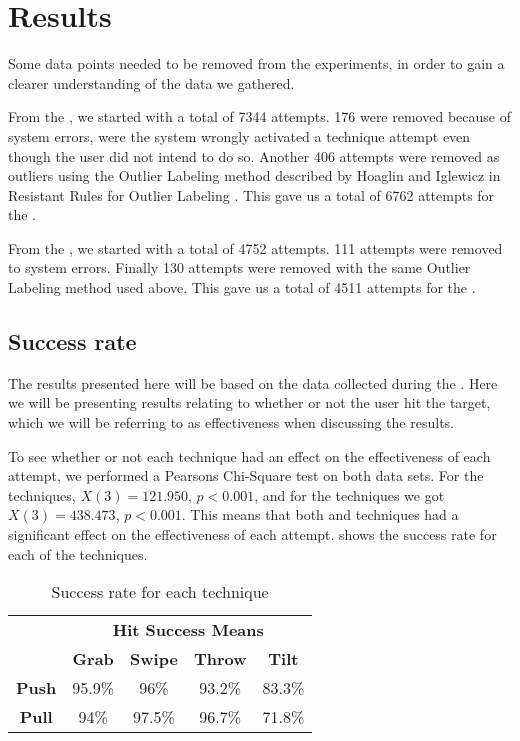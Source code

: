 \section{Results}\label{sec:results}
Some data points needed to be removed from the experiments, in order to gain a clearer understanding of the data we gathered. 

From the \target, we started with a total of 7344 attempts.
176 were removed because of system errors, were the system wrongly activated a technique attempt even though the user did not intend to do so.
Another 406 attempts were removed as outliers using the Outlier Labeling method described by Hoaglin and Iglewicz in Resistant Rules for Outlier Labeling \cite{Hoaglin:1987}.
This gave us a total of 6762 attempts for the \target.

From the \accuracy, we started with a total of 4752 attempts.
111 attempts were removed to system errors. 
Finally 130 attempts were removed with the same Outlier Labeling method used above.
This gave us a total of 4511 attempts for the \accuracy.

\subsection{Success rate}
The results presented here will be based on the data collected during the \target. 
Here we will be presenting results relating to whether or not the user hit the target, which we will be referring to as effectiveness when discussing the results. 

To see whether or not each technique had an effect on the effectiveness of each attempt, we performed a Pearsons Chi-Square test on both data sets. 
For the \push techniques, $X(3)=121.950$, $p<0.001$, and for the \pull techniques we got $X(3)=438.473$, $p<0.001$. 
This means that both \push and \pull techniques had a significant effect on the effectiveness of each attempt. 
 shows the success rate for each of the techniques. 

\begin{table}[H]
	\centering
	\def\arraystretch{1.5}
		\begin{tabular}{c c c c c}
			\cline{2-5}
			& \multicolumn{4}{c}{\textbf{Hit Success Means}} \\
			\cline{2-5}
			& \textbf{Grab} & \textbf{Swipe} & \textbf{Throw} & \textbf{Tilt} \\ \hline
			\textbf{Push} & 95.9\% & 96\% & 93.2\% & 83.3\% \\ \hline
			\textbf{Pull} & 94\% & 97.5\% & 96.7\% & 71.8\% \\ \hline
		\end{tabular}
	\caption{Success rate for each technique}
	\label{tab:successRate}
\end{table}

